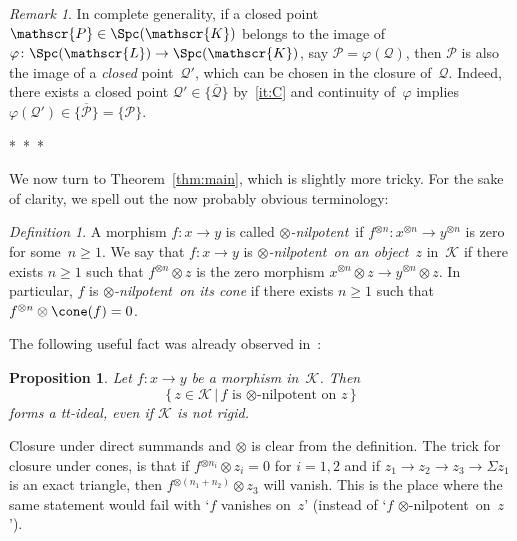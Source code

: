 \documentclass{amsart}
\numberwithin{equation}{section}
\newtheorem{Prop}[equation]{Proposition}
\theoremstyle{remark}
\newtheorem{Def}[equation]{Definition}
\newtheorem{Rem}[equation]{Remark}
\begin{document}
\begin{Rem}
In complete generality, if a closed point ${{\mathscr{{P}}}}\in{\Spc({\mathscr{K}})}$ belongs to the image of $\varphi\colon{\Spc({\mathscr{L}})}\to {\Spc({\mathscr{K}})}$, say ${{\mathscr{{P}}}}=\varphi({{\mathscr{{Q}}}})$, then ${{\mathscr{{P}}}}$ is also the image of a \emph{closed} point~${{\mathscr{{Q}}}}'$, which can be chosen in the closure of~${{\mathscr{{Q}}}}$. Indeed, there exists a closed point ${{\mathscr{{Q}}}}'\in{\overline{\{{{\mathscr{{Q}}}}\}}}$ by~\eqref{it:C} and continuity of~$\varphi$ implies $\varphi({{\mathscr{{Q}}}}')\in{\overline{\{{{\mathscr{{P}}}}\}}}=\{{{\mathscr{{P}}}}\}$.
\end{Rem}

\begin{center}*\ *\ *\end{center}

We now turn to Theorem~\ref{thm:main}, which is slightly more tricky. For the sake of clarity, we spell out the now probably obvious terminology:
\begin{Def}
\label{def:tens-nil}A morphism $f\colon x\to y$ is called \emph{$\otimes$-nilpotent}\  if $f{^{\otimes {n}}}\colon x{^{\otimes {n}}}\to y{^{\otimes {n}}}$ is zero for some~$n\ge 1$.
We say that $f\colon x\to y$ is \emph{$\otimes$-nilpotent\ on an object~$z$} in~${\mathscr{{K}}}$ if there exists $n\ge 1$ such that $f{^{\otimes {n}}}\otimes z$ is the zero morphism $x{^{\otimes {n}}}\otimes z\to y{^{\otimes {n}}}\otimes z$. In particular, $f$ is \emph{{$\otimes$-nilpotent}\ on its cone} if there exists $n\ge 1$ such that $f{^{\otimes {n}}}\otimes \cone(f)=0$.
\end{Def}

The following useful fact was already observed in~\cite[Prop.\,2.12]{Balmer10b}:
\begin{Prop}
\label{prop:nil-tt-ideal}Let $f\colon x\to y$ be a morphism in~${\mathscr{{K}}}$. Then
\[
{\big\{\,{z\in{\mathscr{{K}}}}\,\big|\,{f\textrm{ is {$\otimes$-nilpotent}\ on }z}\,\big\}}
\]
forms a tt-ideal, even if ${\mathscr{{K}}}$ is not rigid.
\end{Prop}

Closure under direct summands and $\otimes$ is clear from the definition. The trick for closure under cones, is that if $f{^{\otimes {n_i}}}\otimes z_i=0$ for $i=1,2$ and if $z_1\to z_2\to z_3\to \Sigma z_1$ is an exact triangle, then $f{^{\otimes {(n_1+n_2)}}}\otimes z_3$ will vanish. This is the place where the same statement would fail with `$f$ vanishes on~$z$' (instead of `$f$ {$\otimes$-nilpotent}\ on~$z$').
\end{document}
